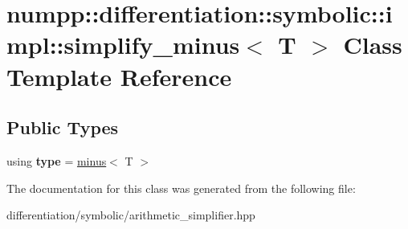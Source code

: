\hypertarget{classnumpp_1_1differentiation_1_1symbolic_1_1impl_1_1simplify__minus}{}\section{numpp\+:\+:differentiation\+:\+:symbolic\+:\+:impl\+:\+:simplify\+\_\+minus$<$ T $>$ Class Template Reference}
\label{classnumpp_1_1differentiation_1_1symbolic_1_1impl_1_1simplify__minus}
\subsection*{Public Types}
\begin{DoxyCompactItemize}
\item 
\mbox{\label{classnumpp_1_1differentiation_1_1symbolic_1_1impl_1_1simplify__minus_ab95878da4d21f5cb885adbe908aecc6d}} 
using {\bfseries type} = \hyperlink{classnumpp_1_1differentiation_1_1symbolic_1_1minus}{minus}$<$ T $>$
\end{DoxyCompactItemize}


The documentation for this class was generated from the following file\+:\begin{DoxyCompactItemize}
\item 
differentiation/symbolic/arithmetic\+\_\+simplifier.\+hpp\end{DoxyCompactItemize}
